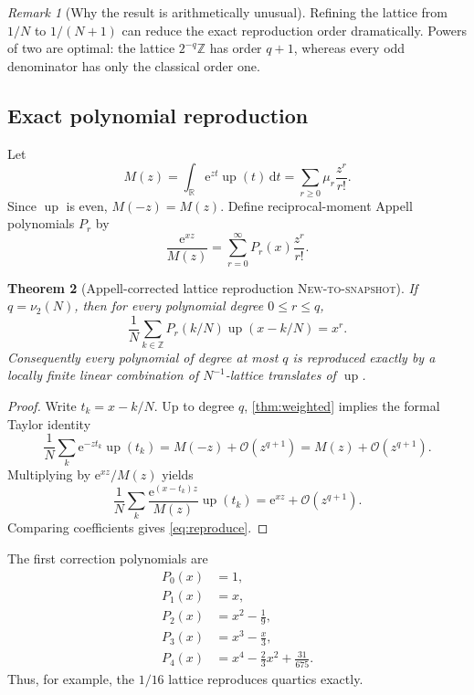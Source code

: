 \documentclass[11pt,oneside]{article}
\numberwithin{equation}{section}
\newtheorem{theorem}{Theorem}[section]
\theoremstyle{definition}
\theoremstyle{remark}
\newtheorem{remark}[theorem]{Remark}
\newcommand{\R}{\mathbb R}
\newcommand{\Z}{\mathbb Z}
\newcommand{\dd}{\,\mathrm d}
\newcommand{\e}{\mathrm e}
\newcommand{\Up}{\operatorname{up}}
\newcommand{\bigO}{\mathcal O}
\newcommand{\NewResult}{\textsc{New-to-snapshot}}
\begin{document}
\begin{remark}[Why the result is arithmetically unusual]
Refining the lattice from $1/N$ to $1/(N+1)$ can reduce the exact reproduction
order dramatically.  Powers of two are optimal: the lattice $2^{-q}\Z$ has
order $q+1$, whereas every odd denominator has only the classical order one.
\end{remark}

\subsection{Exact polynomial reproduction}

Let
\begin{equation}
 M(z)=\int_{\R}\e^{zt}\Up(t)\dd t
     =\sum_{r\ge0}\mu_r\frac{z^r}{r!}.                    \label{eq:mgf}
\end{equation}
Since $\Up$ is even, $M(-z)=M(z)$.  Define reciprocal-moment Appell polynomials
$P_r$ by
\begin{equation}
 \frac{\e^{xz}}{M(z)}=\sum_{r=0}^{\infty}P_r(x)\frac{z^r}{r!}.              \label{eq:Pr}
\end{equation}

\begin{theorem}[Appell-corrected lattice reproduction \NewResult]
\label{thm:reproduction}
If $q=\nu_2(N)$, then for every polynomial degree $0\le r\le q$,
\begin{equation}
 \boxed{\frac1N\sum_{k\in\Z}P_r(k/N)\Up(x-k/N)=x^r.}      \label{eq:reproduce}
\end{equation}
Consequently every polynomial of degree at most $q$ is reproduced exactly by a
locally finite linear combination of $N^{-1}$-lattice translates of $\Up$.
\end{theorem}

\begin{proof}
Write $t_k=x-k/N$.  Up to degree $q$, \cref{thm:weighted} implies the formal
Taylor identity
\[
 \frac1N\sum_k\e^{-zt_k}\Up(t_k)=M(-z)+\bigO(z^{q+1})
 =M(z)+\bigO(z^{q+1}).
\]
Multiplying by $\e^{xz}/M(z)$ yields
\[
 \frac1N\sum_k\frac{\e^{(x-t_k)z}}{M(z)}\Up(t_k)
 =\e^{xz}+\bigO(z^{q+1}).
\]
Comparing coefficients gives \eqref{eq:reproduce}.
\end{proof}

The first correction polynomials are
\begin{align}
 P_0(x)&=1,\nonumber\\
 P_1(x)&=x,\nonumber\\
 P_2(x)&=x^2-\frac19,\nonumber\\
 P_3(x)&=x^3-\frac{x}{3},\nonumber\\
 P_4(x)&=x^4-\frac23x^2+\frac{31}{675}.                   \label{eq:P-first}
\end{align}
Thus, for example, the $1/16$ lattice reproduces quartics exactly.
\end{document}

